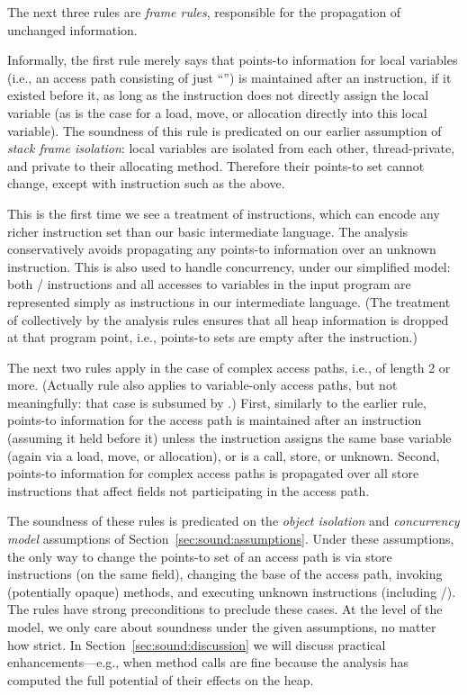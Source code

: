 The next three rules are \emph{frame rules}, responsible for the propagation of unchanged information.  

Informally, the first rule merely says that points-to information for local variables (i.e., an access path consisting of just ``'') is maintained after an instruction, if it existed before it, as long as the instruction does not directly assign the local variable (as is the case for a load, move, or allocation directly into this local variable). The soundness of this rule is predicated on our earlier assumption of \emph{stack frame isolation}: local variables are isolated from each other, thread-private, and private to their allocating method. Therefore their points-to set cannot change, except with instruction such as the above.

This is the first time we see a treatment of \unknown{} instructions, which can encode any richer instruction set than our basic intermediate language. The analysis conservatively avoids propagating any points-to information over an unknown instruction. This is also used to handle concurrency, under our simplified model: both / instructions and all accesses to  variables in the input program are represented simply as \unknown{} instructions in our intermediate language. (The treatment of \unknown{} collectively by the analysis rules ensures that all heap information is dropped at that program point, i.e., points-to sets are empty after the instruction.)

The next two rules apply in the case of complex access paths, i.e., of length 2 or more. (Actually rule  also applies to variable-only access paths, but not meaningfully: that case is subsumed by .) First, similarly to the earlier rule, points-to information for the access path is maintained after an instruction (assuming it held before it) unless the instruction assigns the same base variable (again via a load, move, or allocation), or is a call, store, or unknown. Second, points-to information for complex access paths is propagated over all store instructions that affect fields not participating in the access path.

The soundness of these rules is predicated on the \emph{object isolation} and \emph{concurrency model} assumptions of Section~\ref{sec:sound:assumptions}. Under these assumptions, the only way to change the points-to set of an access path is via store instructions (on the same field), changing the base of the access path, invoking (potentially opaque) methods, and executing unknown instructions (including /). The rules have strong preconditions to preclude these cases. At the level of the model, we only care about soundness under the given assumptions, no matter how strict. In Section~\ref{sec:sound:discussion} we will discuss practical enhancements---e.g., when method calls are fine because the analysis has computed the full potential of their effects on the heap.


